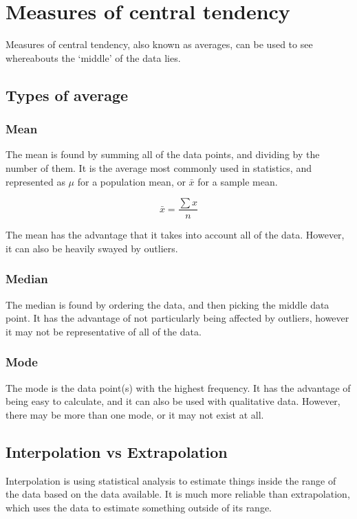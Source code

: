 \section{Measures of central tendency}
Measures of central tendency, also known as averages, can be used to see whereabouts the `middle' of the data lies.
\subsection{Types of average}
\subsubsection{Mean}
The mean is found by summing all of the data points, and dividing by the number of them. It is the average most commonly used in statistics, and represented as $\mu$ for a population mean, or $\bar{x}$ for a sample mean.

\begin{equation}
	\bar{x}=\frac{\sum{x}}{n}
\end{equation}

The mean has the advantage that it takes into account all of the data. However, it can also be heavily swayed by outliers.

\subsubsection{Median}
The median is found by ordering the data, and then picking the middle data point. It has the advantage of not particularly being affected by outliers, however it may not be representative of all of the data.

\subsubsection{Mode}
The mode is the data point(s) with the highest frequency. It has the advantage of being easy to calculate, and it can also be used with qualitative data. However, there may be more than one mode, or it may not exist at all.

\subsection{Interpolation vs Extrapolation}
Interpolation is using statistical analysis to estimate things inside the range of the data based on the data available. It is much more reliable than extrapolation, which uses the data to estimate something outside of its range.

